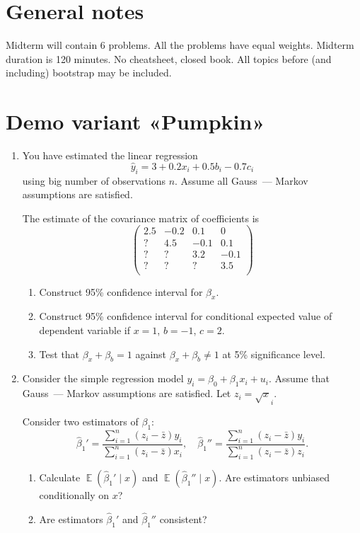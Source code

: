 \documentclass[12pt]{article}
\DeclareMathOperator{\E}{\mathbb{E}}
\newcommand{\hb}{\hat\beta}
\begin{document}
\section*{General notes}

Midterm will contain 6 problems. 
All the problems have equal weights. 
Midterm duration is 120 minutes. 
No cheatsheet, closed book. 
All topics before (and including) bootstrap may be included. 

\section*{Demo variant «Pumpkin»}
\begin{enumerate}
    \item You have estimated the linear regression 
    \[
    \hat y_i  = 3 + 0.2 x_i + 0.5 b_i - 0.7 c_i
    \]
    using big number of observations $n$. 
    Assume all Gauss~— Markov assumptions are satisfied. 

    The estimate of the covariance matrix of coefficients is 
    \[
    \begin{pmatrix}
        2.5 & -0.2 & 0.1  & 0 \\
        ?   &  4.5 & -0.1 & 0.1 \\
        ?   &   ?  & 3.2  & -0.1 \\
        ?   &   ?  &  ?   &  3.5 \\       
    \end{pmatrix}
    \]
    \begin{enumerate}
        \item Construct 95\% confidence interval for $\beta_x$.
        \item Construct 95\% confidence interval for conditional expected value of dependent variable if $x = 1$, $b = -1$, $c = 2$.
        \item Test that $\beta_x + \beta_b = 1$ against $\beta_ x + \beta_b \neq 1$ at 5\% significance level.
    \end{enumerate}


    \item Consider the simple regression model $y_i = \beta_0 + \beta_1 x_i + u_i$.
    Assume that Gauss~— Markov assumptions are satisfied.
    Let $z_i = \sqrt{x}_i$.

    Consider two estimators of $\beta_1$:
    \[
    \hb_1' = \frac{\sum_{i=1}^n(z_i - \bar z)y_i}{\sum_{i=1}^n(z_i - \bar z)x_i}, \quad \hb_1'' = \frac{\sum_{i=1}^n(z_i - \bar z)y_i}{\sum_{i=1}^n(z_i - \bar z)z_i}.
    \]
    \begin{enumerate}
        \item Calculate $\E(\hb_1' \mid x)$ and $\E(\hb_1'' \mid x)$. Are estimators unbiased conditionally on $x$?
        \item Are estimators $\hb_1'$ and $\hb_1''$ consistent?
    \end{enumerate}



\end{enumerate}
\end{document}
